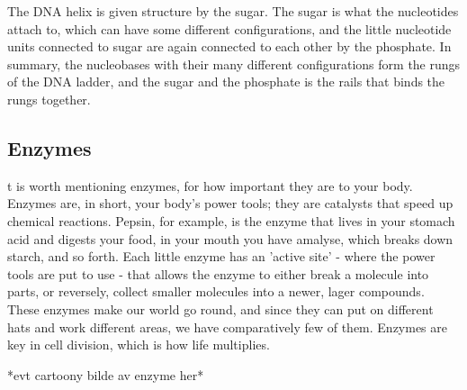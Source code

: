 The DNA helix is given structure by the sugar. The sugar is what the nucleotides attach to, which can have some different configurations, and the little nucleotide units connected to sugar are again connected to each other by the phosphate. In summary, the nucleobases with their many different configurations form the rungs of the DNA ladder, and the sugar and the phosphate is the rails that binds the rungs together.

\subsection*{Enzymes}
t is worth mentioning enzymes, for how important they are to your body. Enzymes are, in short, your body's power tools; they are catalysts that speed up chemical reactions. Pepsin, for example, is the enzyme that lives in your stomach acid and digests your food, in your mouth you have amalyse, which breaks down starch, and so forth. Each little enzyme has an 'active site' - where the power tools are put to use - that allows the enzyme to either break a molecule into parts, or reversely, collect smaller molecules into a newer, lager compounds. These enzymes make our world go round, and since they can put on different hats and work different areas, we have comparatively few of them. Enzymes are key in cell division, which is how life multiplies. 

*evt cartoony bilde av enzyme her*

